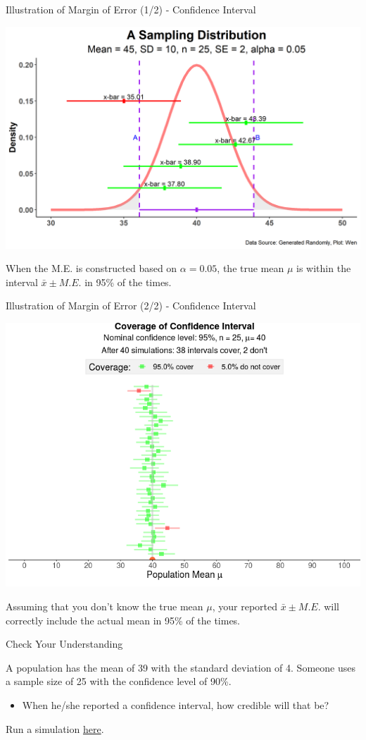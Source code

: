 \documentclass{beamer}
\begin{document}
\begin{frame}{Illustration of Margin of Error (1/2) - Confidence Interval}

\includegraphics[scale=0.5]{images/SamplingDistIntervals.png}

When the M.E. is constructed based on $\alpha = 0.05$, the true mean $\mu$ is within the interval $\bar{x} \pm M.E.$ in 95\% of the times. 

\end{frame}



\begin{frame}{Illustration of Margin of Error (2/2) - Confidence Interval}

\begin{center}
\includegraphics[width = 230 px]{images/section5ConfidenceIntervalMu.png}
\end{center}

Assuming that you don't know the true mean $\mu$, your reported $\bar{x} \pm M.E.$ will correctly include the actual mean in 95\% of the times. 

\end{frame}


\begin{frame}{Check Your Understanding}


A population has the mean of 39 with the standard deviation of 4.  Someone uses a sample size of 25 with the confidence level of 90\%. 
\begin{itemize}
\item When he/she reported a confidence interval, how credible will that be? 
\end{itemize}

Run a simulation \href{https://istats.shinyapps.io/ExploreCoverage/}{here}.

\end{frame}
\end{document}
